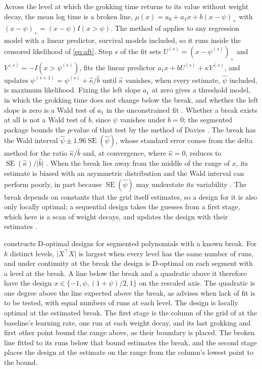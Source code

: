 \documentclass[a4paper,11pt]{article} %
\begin{document}
Across the level at which the grokking time returns to its value without
weight decay, the mean log time is a broken line,
$\mu(x)=a_0+a_1x+b(x-\psi)_+$ with $(x-\psi)_+=(x-\psi)I(x>\psi)$. The method
of \citet{muggeoEstimatingRegressionModels2003} applies to any regression model
with a linear predictor, survival models included, so it runs inside the
censored likelihood of \eqref{eq:aft}. Step $s$ of the fit sets
$U^{(s)}=(x-\psi^{(s)})_+$ and $V^{(s)}=-I(x>\psi^{(s)})$, fits the linear
predictor $a_1x + b U^{(s)} + \kappa V^{(s)}$, and updates
$\psi^{(s+1)}=\psi^{(s)}+\hat\kappa/\hat b$ until $\hat\kappa$ vanishes, when
every estimate, $\hat\psi$ included, is maximum likelihood. Fixing the left
slope $a_1$ at zero gives a threshold model, in which the grokking time does
not change below the break, and whether the left slope is zero is a Wald test
of $a_1$ in the unconstrained fit \citep{muggeoSegmentedPackageFit2008}.
Whether a break exists at all is not a Wald test of $b$, since $\psi$
vanishes under $b=0$; the segmented package bounds the $p$-value of that test
by the method of Davies \citep{muggeoSegmentedPackageFit2008}. The break has
the Wald interval $\hat\psi\pm1.96\operatorname{SE}(\hat\psi)$, whose standard
error comes from the delta method for the ratio $\hat\kappa/\hat b$ and, at
convergence, where $\hat\kappa=0$, reduces to
$\operatorname{SE}(\hat\kappa)/\lvert\hat b\rvert$
\citep{muggeoEstimatingRegressionModels2003,muggeoSegmentedPackageFit2008}.
When the break lies away from the middle of the range of $x$, its estimate is
biased with an asymmetric distribution and the Wald interval can perform
poorly, in part because $\operatorname{SE}(\hat\psi)$ may understate its
variability \citep{muggeoIntervalEstimationBreakpoint2017}. The break
depends on constants that
the grid itself estimates, so a design for it is also only locally optimal; a
sequential design takes the guesses from a first stage, which here is a scan
of weight decays, and updates the design with their estimates
\citep{bergerIntroductionOptimalDesigns2009}.

\citet{parkExperimentalDesignsFitting1978a} constructs D-optimal designs for
segmented polynomials with a known break. For $k$ distinct levels,
$\lvert X^\top X\rvert$ is largest when every level has the same number of
runs, and under continuity at the break the design is D-optimal on each segment
with a level at the break. A line below the break and a quadratic above it
therefore have the design $x\in\{-1,\psi,(1+\psi)/2,1\}$ on the rescaled axis.
The quadratic is one degree above the line expected above the break, as
\citet{parkExperimentalDesignsFitting1978a} advises when lack of fit is to be
tested, with equal numbers of runs at each level. The design is locally optimal
at the estimated break. The first stage is the column of the grid of
\citet{pracherSpectralTheoryGrokking2026} at the baseline's learning rate, one
run at each weight decay, and its last grokking and first other point bound the
range above, as their boundary is placed. The broken line fitted to its runs
below that bound estimates the break, and the second stage places the design
at the estimate on the range from the column's lowest point to the bound.
\end{document}
